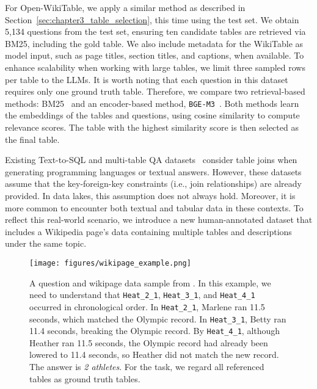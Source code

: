  For Open-WikiTable, we apply a similar method as described in Section~\ref{sec:chapter3_table_selection}, this time using the test set. We obtain 5,134 questions from the test set, ensuring ten candidate tables are retrieved via BM25, including the gold table. We also include metadata for the WikiTable as model input, such as page titles, section titles, and captions, when available. To enhance scalability when working with large tables, we limit three sampled rows per table to the LLMs. It is worth noting that each question in this dataset requires only one ground truth table. Therefore, we compare two retrieval-based methods: BM25~\citep{bm25} and an encoder-based method, \texttt{BGE-M3}~\citep{chen-etal-2024-m3}. Both methods learn the embeddings of the tables and questions, using cosine similarity to compute relevance scores. The table with the highest similarity score is then selected as the final table.

Existing Text-to-SQL and multi-table QA datasets~\citep{pal-etal-2023-multitabqa} consider table joins when generating programming languages or textual answers. However, these datasets assume that the key-foreign-key constraints (i.e., join relationships) are already provided. In data lakes, this assumption does not always hold. Moreover, it is more common to encounter both textual and tabular data in these contexts. 
%
To reflect this real-world scenario, we introduce a new human-annotated dataset that includes a Wikipedia page's data containing multiple tables and descriptions under the same topic.

\begin{figure}
    \centering
    \texttt{[image: figures/wikipage\_example.png]}
    \caption{A question and wikipage data sample from \wikipage. In this example, we need to understand that \texttt{Heat\_2\_1}, \texttt{Heat\_3\_1}, and \texttt{Heat\_4\_1} occurred in chronological order. In \texttt{Heat\_2\_1}, Marlene ran 11.5 seconds, which matched the Olympic record. In \texttt{Heat\_3\_1}, Betty ran 11.4 seconds, breaking the Olympic record. By \texttt{Heat\_4\_1}, although Heather ran 11.5 seconds, the Olympic record had already been lowered to 11.4 seconds, so Heather did not match the new record. The answer is \textit{2 athletes}. For the \datadiscovery task, we regard all referenced tables as ground truth tables.}
    \label{fig:wikipage_heat}
\end{figure}

